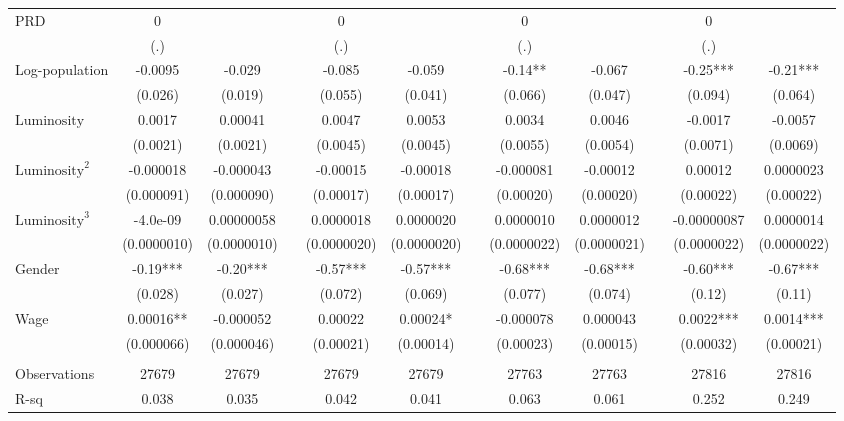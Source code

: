 \begin{tabular}{lccccccccccc}
PRD   & 0     &       &       & 0     &       &       & 0     &       &       & 0     &  \\
      & (.)   &       &       & (.)   &       &       & (.)   &       &       & (.)   &  \\
\midrule
Log-population & -0.0095 & -0.029 &       & -0.085 & -0.059 &       & -0.14** & -0.067 &       & -0.25*** & -0.21*** \\
      & (0.026) & (0.019) &       & (0.055) & (0.041) &       & (0.066) & (0.047) &       & (0.094) & (0.064) \\
$\text{Luminosity}$ & 0.0017 & 0.00041 &       & 0.0047 & 0.0053 &       & 0.0034 & 0.0046 &       & -0.0017 & -0.0057 \\
      & (0.0021) & (0.0021) &       & (0.0045) & (0.0045) &       & (0.0055) & (0.0054) &       & (0.0071) & (0.0069) \\
$\text{Luminosity}^2$ & -0.000018 & -0.000043 &       & -0.00015 & -0.00018 &       & -0.000081 & -0.00012 &       & 0.00012 & 0.0000023 \\
      & (0.000091) & (0.000090) &       & (0.00017) & (0.00017) &       & (0.00020) & (0.00020) &       & (0.00022) & (0.00022) \\
$\text{Luminosity}^3$ & -4.0e-09 & 0.00000058 &       & 0.0000018 & 0.0000020 &       & 0.0000010 & 0.0000012 &       & -0.00000087 & 0.0000014 \\
      & (0.0000010) & (0.0000010) &       & (0.0000020) & (0.0000020) &       & (0.0000022) & (0.0000021) &       & (0.0000022) & (0.0000022) \\
Gender & -0.19*** & -0.20*** &       & -0.57*** & -0.57*** &       & -0.68*** & -0.68*** &       & -0.60*** & -0.67*** \\
      & (0.028) & (0.027) &       & (0.072) & (0.069) &       & (0.077) & (0.074) &       & (0.12) & (0.11) \\
Wage  & 0.00016** & -0.000052 &       & 0.00022 & 0.00024* &       & -0.000078 & 0.000043 &       & 0.0022*** & 0.0014*** \\
      & (0.000066) & (0.000046) &       & (0.00021) & (0.00014) &       & (0.00023) & (0.00015) &       & (0.00032) & (0.00021) \\
      &       &       &       &       &       &       &       &       &       &       &  \\
\midrule
Observations & 27679 & 27679 &       & 27679 & 27679 &       & 27763 & 27763 &       & 27816 & 27816 \\
R-sq  & 0.038 & 0.035 &       & 0.042 & 0.041 &       & 0.063 & 0.061 &       & 0.252 & 0.249 \\

\end{tabular}
